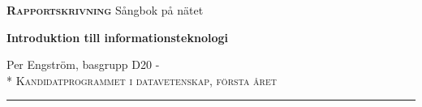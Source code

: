 


    
    \pagestyle{empty}
    
    \Huge \textbf{\textsc{Rapportskrivning}} \LARGE
    Sångbok på nätet
         
    \Large \textbf{Introduktion till informationsteknologi}
    
    \normalsize Per Engström, basgrupp D20 \hfill {}- \\*	{\raggedleft \textsc{Kandidatprogrammet i datavetenskap, första året}} \\
    \rule{\textwidth}{1pt}
    
    \bigskip
    
\newpage
    
\tableofcontents
\newpage

\pagestyle{fancy}



